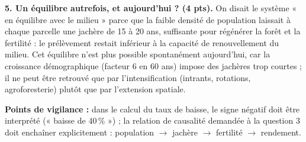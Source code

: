 \documentclass[11pt]{article}
\begin{document}
\begin{corrige}
\textbf{5. Un équilibre autrefois, et aujourd'hui ? (4 pts).} On disait le système « en équilibre avec le milieu » parce que la faible densité de population laissait à chaque parcelle une jachère de 15 à 20 ans, suffisante pour régénérer la forêt et la fertilité : le prélèvement restait inférieur à la capacité de renouvellement du milieu. Cet équilibre n'est plus possible spontanément aujourd'hui, car la croissance démographique (facteur 6 en 60 ans) impose des jachères trop courtes ; il ne peut être retrouvé que par l'intensification (intrants, rotations, agroforesterie) plutôt que par l'extension spatiale.

\textbf{Points de vigilance :} dans le calcul du taux de baisse, le signe négatif doit être interprété (« baisse de 40\,\% ») ; la relation de causalité demandée à la question 3 doit enchaîner explicitement : population $\rightarrow$ jachère $\rightarrow$ fertilité $\rightarrow$ rendement.
\end{corrige}
\end{document}
